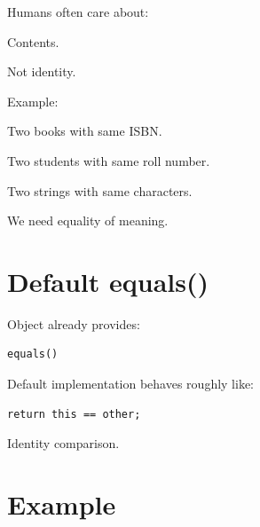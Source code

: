 \documentclass[11pt,a4paper]{book}
\begin{document}
Humans often care about:


Contents.


Not identity.


Example:


Two books with same ISBN.


Two students with same roll number.


Two strings with same characters.


We need equality of meaning.


\section{Default equals()}

Object already provides:

\begin{verbatim} 
equals()
\end{verbatim}


Default implementation behaves
roughly like:

\begin{verbatim} 
return this == other;
\end{verbatim}


Identity comparison.


\section{Example}
\end{document}
